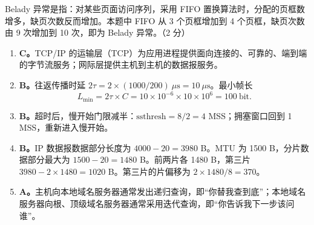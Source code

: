 \documentclass[a4paper,11pt]{article}
\begin{document}
\begin{enumerate}[start=8, label=\textbf{\arabic*.}, leftmargin=2.4em, itemsep=0.45em]
\begin{enumerate}[label=（\arabic*）, leftmargin=2.2em, itemsep=2pt]
  Belady 异常是指：对某些页面访问序列，采用 FIFO 置换算法时，分配的页框数增多，缺页次数反而增加。本题中 FIFO 从 3 个页框增加到 4 个页框，缺页次数由 9 次增加到 10 次，即为 Belady 异常。\hfill（2 分）
\end{enumerate}

\end{enumerate}


\begin{enumerate}[start=13, label=\textbf{\arabic*.}, leftmargin=2.4em, itemsep=0.45em]

\item \textbf{C。}TCP/IP 的运输层（TCP）为应用进程提供面向连接的、可靠的、端到端的字节流服务；网际层提供主机到主机的数据报服务。

\item \textbf{B。}往返传播时延 $2\tau=2\times(1000/200)\ \mu\text{s}=10\ \mu\text{s}$。最小帧长
\[
L_{\min}=2\tau\times C=10\times10^{-6}\times10\times10^{6}=100\ \text{bit}.
\]

\item \textbf{B。}超时后，慢开始门限减半：$\text{ssthresh}=8/2=4$ MSS；拥塞窗口回到 1 MSS，重新进入慢开始。

\item \textbf{B。}IP 数据报数据部分长度为 $4000-20=3980$ B。MTU 为 1500 B，分片数据部分最大为 $1500-20=1480$ B。前两片各 1480 B，第三片 $3980-2\times1480=1020$ B。第三片的片偏移为 $2\times1480/8=370$。

\item \textbf{A。}主机向本地域名服务器通常发出递归查询，即“你替我查到底”；本地域名服务器向根、顶级域名服务器通常采用迭代查询，即“你告诉我下一步该问谁”。


\end{enumerate}
\end{document}
